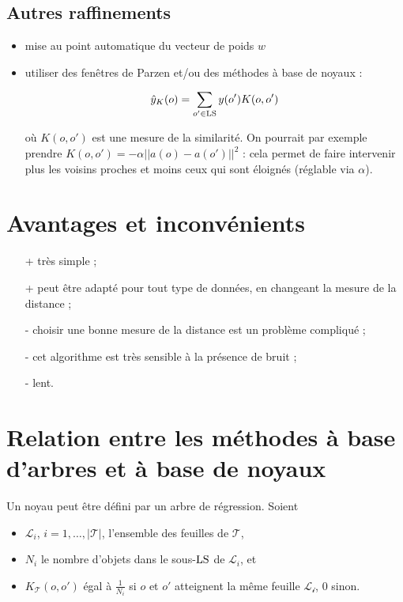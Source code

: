 		
		\subsection{Autres raffinements}
		
		\begin{itemize}
			\item mise au point automatique du vecteur de poids $w$
			\item utiliser des fenêtres de Parzen et/ou des méthodes à base de noyaux :
			
			$$\hat{y}_K(o) = \sum_{o' \in \text{LS}} y(o') K(o, o')$$
			
			où $K(o, o')$ est une mesure de la similarité. On pourrait par exemple prendre $K(o, o') = -\alpha \vert \vert a(o) - a(o') \vert \vert^2$ : cela permet de faire intervenir plus les voisins proches et moins ceux qui sont éloignés (réglable via $\alpha$).
		\end{itemize}

	\section{Avantages et inconvénients}
		
	\begin{itemize}
		\item[+] très simple ;
		\item[+] peut être adapté pour tout type de données, en changeant la mesure de la distance ;
		\item[-] choisir une bonne mesure de la distance est un problème compliqué ;
		\item[-] cet algorithme est très sensible à la présence de bruit ;
		\item[-] lent.
	\end{itemize}
	
	
	\section{Relation entre les méthodes à base d'arbres et à base de noyaux}
	
	Un noyau peut être défini par un arbre de régression. Soient
	
	\begin{itemize}
		\item $\mathcal{L}_i$, $i = 1, \dots , \vert \mathcal{T} \vert$, l'ensemble des feuilles de $\mathcal{T}$,
		\item $N_i$ le nombre d'objets dans le sous-$\text{LS}$ de $\mathcal{L}_i$, et
		\item $K_\mathcal{T}(o, o')$ égal à $\frac{1}{N_i}$ si $o$ et $o'$ atteignent la même feuille $\mathcal{L_i}$, 0 sinon.
	\end{itemize}
	
